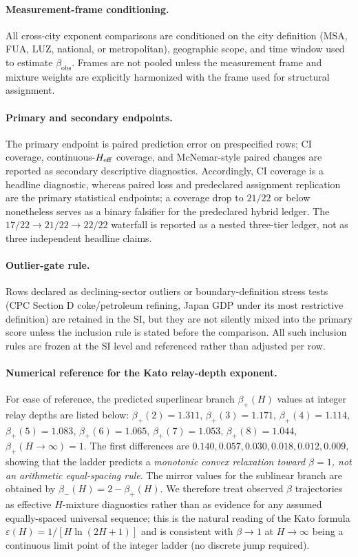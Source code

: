 \paragraph{Measurement-frame conditioning.}
All cross-city exponent comparisons are conditioned on the city definition
(MSA, FUA, LUZ, national, or metropolitan), geographic scope, and time window
used to estimate \(\beta_{\mathrm{obs}}\).  Frames are not pooled unless the
measurement frame and mixture weights are explicitly harmonized with the
frame used for structural assignment.

\paragraph{Primary and secondary endpoints.}
The primary endpoint is paired prediction error on prespecified rows; CI
coverage, continuous-\(H_{\mathrm{eff}}\) coverage, and McNemar-style paired changes
are reported as secondary descriptive diagnostics. Accordingly, CI coverage is a headline diagnostic, whereas paired loss and predeclared assignment replication are the primary statistical endpoints; a coverage drop to $21/22$ or below nonetheless serves as a binary falsifier for the predeclared hybrid ledger.  The
\(17/22\to 21/22\to 22/22\) waterfall is reported as a nested three-tier
ledger, not as three independent headline claims.

\paragraph{Outlier-gate rule.}
Rows declared as declining-sector outliers or boundary-definition stress
tests (CPC Section D coke/petroleum refining, Japan GDP under its most
restrictive definition) are retained in the SI, but they are not silently
mixed into the primary score unless the inclusion rule is stated before the
comparison.  All such inclusion rules are frozen at the SI level and
referenced rather than adjusted per row.

\paragraph{Numerical reference for the Kato relay-depth exponent.}
For ease of reference, the predicted superlinear branch $\beta_+(H)$ values at integer relay depths are listed below:
$\beta_+(2)=1.311$, $\beta_+(3)=1.171$, $\beta_+(4)=1.114$, $\beta_+(5)=1.083$, $\beta_+(6)=1.065$, $\beta_+(7)=1.053$, $\beta_+(8)=1.044$, $\beta_+(H{\to}\infty)=1$. The first differences are $0.140, 0.057, 0.030, 0.018, 0.012, 0.009$, showing that the ladder predicts a \emph{monotonic convex relaxation toward $\beta{=}1$, not an arithmetic equal-spacing rule}. The mirror values for the sublinear branch are obtained by $\beta_-(H)=2-\beta_+(H)$. We therefore treat observed $\beta$ trajectories as effective $H$-mixture diagnostics rather than as evidence for any assumed equally-spaced universal sequence; this is the natural reading of the Kato formula $\varepsilon(H)=1/[H\ln(2H{+}1)]$ and is consistent with $\beta\!\to\!1$ at $H\!\to\!\infty$ being a continuous limit point of the integer ladder (no discrete jump required).

